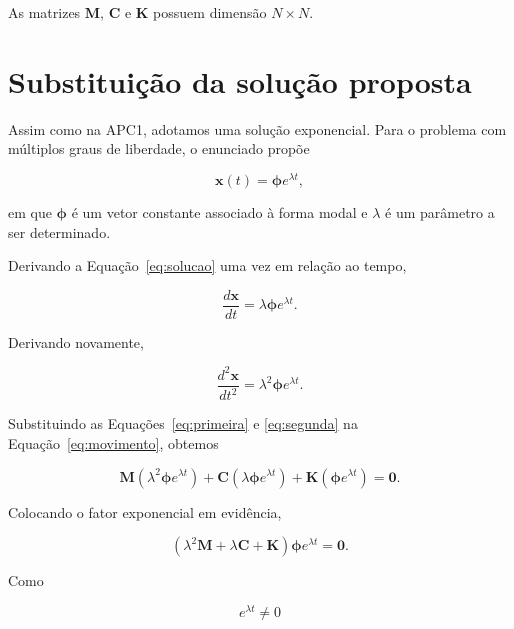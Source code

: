 \documentclass[12pt,a4paper]{article}
\begin{document}
As matrizes $\mathbf{M}$, $\mathbf{C}$ e $\mathbf{K}$ possuem dimensão
$N\times N$.

\section{Substituição da solução proposta}

Assim como na APC1, adotamos uma solução exponencial. Para o problema com
múltiplos graus de liberdade, o enunciado propõe

\begin{equation}
\mathbf{x}(t)=\boldsymbol{\phi}e^{\lambda t},
\label{eq:solucao}
\end{equation}

em que $\boldsymbol{\phi}$ é um vetor constante associado à forma modal e
$\lambda$ é um parâmetro a ser determinado.

Derivando a Equação~\eqref{eq:solucao} uma vez em relação ao tempo,

\begin{equation}
\frac{d\mathbf{x}}{dt}
=
\lambda\boldsymbol{\phi}e^{\lambda t}.
\label{eq:primeira}
\end{equation}

Derivando novamente,

\begin{equation}
\frac{d^2\mathbf{x}}{dt^2}
=
\lambda^2\boldsymbol{\phi}e^{\lambda t}.
\label{eq:segunda}
\end{equation}

Substituindo as Equações~\eqref{eq:primeira} e
\eqref{eq:segunda} na Equação~\eqref{eq:movimento}, obtemos

\begin{equation}
\mathbf{M}
\left(\lambda^2\boldsymbol{\phi}e^{\lambda t}\right)
+
\mathbf{C}
\left(\lambda\boldsymbol{\phi}e^{\lambda t}\right)
+
\mathbf{K}
\left(\boldsymbol{\phi}e^{\lambda t}\right)
=\mathbf{0}.
\end{equation}

Colocando o fator exponencial em evidência,

\begin{equation}
\left(
\lambda^2\mathbf{M}
+
\lambda\mathbf{C}
+
\mathbf{K}
\right)
\boldsymbol{\phi}e^{\lambda t}
=\mathbf{0}.
\end{equation}

Como

\begin{equation}
e^{\lambda t}\neq 0
\end{equation}
\end{document}
